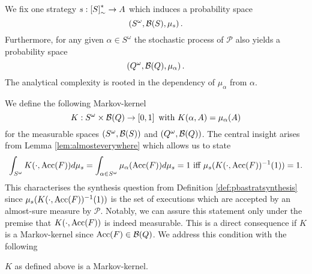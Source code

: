 We fix one strategy $s:\left[S\right]_{\sim}^{*}\rightarrow A$ which induces a 
probability space
\begin{equation*}
  \left(S^{\omega},\mathcal{B}(S), \mu_{s}\right).
\end{equation*}
Furthermore, for any given $\alpha\in S^{\omega}$ the stochastic process of
$\mathcal{P}$ also yields a probability space
\begin{equation*}
  \left(Q^{\omega},\mathcal{B}(Q), \mu_{\alpha}\right).
\end{equation*}
The analytical complexity is rooted in the dependency of $\mu_{\alpha}$ from
$\alpha$.

We define the following Markov-kernel
\begin{equation*}
  K:S^{\omega}\times\mathcal{B}(Q)\rightarrow\left[0,1\right]\text{ with }
    K(\alpha, A) = \mu_{\alpha}(A)
\end{equation*}
for the measurable spaces $\left(S^{\omega},\mathcal{B}(S)\right)$ and 
$\left(Q^{\omega},\mathcal{B}(Q)\right)$. The central insight arises from Lemma 
\ref{lem:almosteverywhere} which allows us to state
\begin{equation*}
  \int_{S^{\omega}}K(\cdot, \operatorname{Acc}(F)) d\mu_{s} 
  = \int_{\alpha\in S^{\omega}}\mu_{\alpha}(\operatorname{Acc}(F))d\mu_{s} = 1 \text{ iff }
    \mu_{s}(K(\cdot,\operatorname{Acc}(F))^{-1}(1)) = 1.
\end{equation*}
This characterises the synthesis question from Definition
\ref{def:pbastratsynthesis} since $\mu_{s}(K(\cdot,\operatorname{Acc}(F))^{-1}(1))$ is the
set of executions which are accepted by an almost-sure measure by
$\mathcal{P}$. Notably, we can assure this statement only under the premise
that $K(\cdot, \operatorname{Acc}(F))$ is indeed measurable. This is a direct consequence if
$K$ is a Markov-kernel since $\operatorname{Acc}(F)\in\mathcal{B}(Q)$. We address this
condition with the following
\begin{lemma}
  $K$ as defined above is a Markov-kernel.
\end{lemma}
